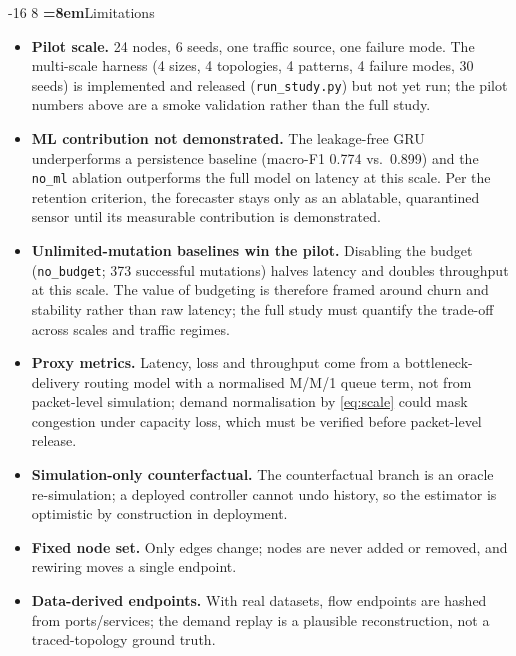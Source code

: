 \documentclass[runningheads]{llncs}
\makeatletter
\renewcommand\section{\@startsection{section}{1}{\z@}%
  {-16\p@ \@plus -4\p@ \@minus -4\p@}%
  {8\p@ \@plus 4\p@ \@minus 4\p@}%
  {\normalfont\large\bfseries\boldmath\color{vitblue}%
   \rightskip=\z@ \@plus 8em\pretolerance=10000}}
\let\plens@section\section
\renewcommand\section{\clearpage\plens@section}
\makeatother
\begin{document}
\section{Limitations}
\label{sec:limitations}

\begin{itemize}
\item \textbf{Pilot scale.} 24 nodes, 6 seeds, one traffic source, one
failure mode. The multi-scale harness (4 sizes, 4 topologies, 4 patterns,
4 failure modes, 30 seeds) is implemented and released
(\texttt{run\_study.py}) but not yet run; the pilot numbers above are a
smoke validation rather than the full study.
\item \textbf{ML contribution not demonstrated.} The leakage-free GRU
underperforms a persistence baseline (macro-F1 0.774 vs.\ 0.899) and the
\texttt{no\_ml} ablation outperforms the full model on latency at this
scale. Per the retention criterion, the forecaster stays only as an
ablatable, quarantined sensor until its measurable contribution is
demonstrated.
\item \textbf{Unlimited-mutation baselines win the pilot.} Disabling the
budget (\texttt{no\_budget}; 373 successful mutations) halves latency and
doubles throughput at this scale. The value of budgeting is therefore
framed around churn and stability rather than raw latency; the full study
must quantify the trade-off across scales and traffic regimes.
\item \textbf{Proxy metrics.} Latency, loss and throughput come from a
bottleneck-delivery routing model with a normalised M/M/1 queue term, not
from packet-level simulation; demand normalisation by \eqref{eq:scale}
could mask congestion under capacity loss, which must be verified before
packet-level release.
\item \textbf{Simulation-only counterfactual.} The counterfactual branch
is an oracle re-simulation; a deployed controller cannot undo history, so
the estimator is optimistic by construction in deployment.
\item \textbf{Fixed node set.} Only edges change; nodes are never added or
removed, and rewiring moves a single endpoint.
\item \textbf{Data-derived endpoints.} With real datasets, flow endpoints
are hashed from ports/services; the demand replay is a plausible
reconstruction, not a traced-topology ground truth.
\end{itemize}
\end{document}
